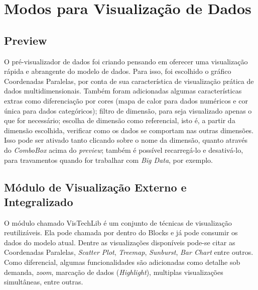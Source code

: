 \documentclass[
	12pt,				%
	openright,			%
	twoside,			%
	a4paper,			%
	english,			%
	brazil				%
	]{abntex2}
\begin{document}
	\section{Modos para Visualização de Dados}

		\subsection{Preview}
		O pré-visualizador de dados foi criando pensando em oferecer uma visualização rápida e abrangente do modelo de dados.
		Para isso, foi escolhido o gráfico Coordenadas Paralelas, por conta de sua característica de visualização prática de dados multidimensionais.
		Também foram adicionadas algumas características extras como diferenciação por cores (mapa de calor para dados numéricos e cor única para dados categóricos); 
			filtro de dimensão, para seja visualizado apenas o que for necessário;
			escolha de dimensão como referencial, isto é, a partir da dimensão escolhida, verificar como os dados se comportam nas outras dimensões. Isso pode ser ativado tanto clicando sobre o nome da dimensão, quanto através do \emph{ComboBox} acima do \emph{preview};
			também é possível recarregá-lo e desativá-lo, para travamentos quando for trabalhar com \emph{Big Data}, por exemplo.

		\subsection{Módulo de Visualização Externo e Integralizado}
		O módulo chamado VisTechLib é um conjunto de técnicas de visualização reutilizáveis.
		Ela pode chamada por dentro do Blocks e já pode consumir os dados do modelo atual.
		Dentre as visualizações disponíveis pode-se citar as Coordenadas Paralelas, \emph{Scatter Plot}, \emph{Treemap}, \emph{Sunburst}, \emph{Bar Chart} entre outros.
		Como diferencial, algumas funcionalidades são adicionadas como detalhe sob demanda, \emph{zoom}, marcação de dados (\emph{Highlight}), multiplas visualizações simultâneas, entre outras.
\end{document}

